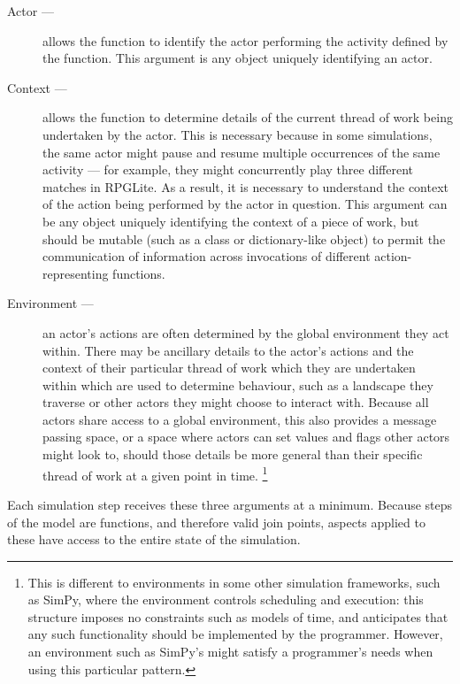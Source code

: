 \begin{description}
  \item[Actor ---] allows the function to identify the actor performing the activity
    defined by the function. This argument is any object uniquely identifying an
    actor.
  \item[Context ---] allows the function to determine details of the current
    thread of work being undertaken by the actor. This is necessary because in
    some simulations, the same actor might pause and resume multiple occurrences
    of the same activity --- for example, they might concurrently play three
    different matches in RPGLite. As a result, it is necessary to understand the
    context of the action being performed by the actor in question. This
    argument can be any object uniquely identifying the context of a piece of
    work, but should be mutable (such as a class or dictionary-like object) to
    permit the communication of information across invocations of different
    action-representing functions.
  \item[Environment ---] an actor's actions are often determined by the global
    environment they act within. There may be ancillary details to the
    actor's actions and the context of their particular thread of work which
    they are undertaken within which are used to determine behaviour, such
    as a landscape they traverse or other actors they might choose to
    interact with. Because all actors share access to a global environment,
    this also provides a message passing space, or a space where actors can
    set values and flags other actors might look to, should those details be
    more general than their specific thread of work at a given point in time.
    \footnote{This is different to environments in some other simulation frameworks, such
    as SimPy\cite{simpy_documentation}, where the environment controls scheduling and
    execution: this structure imposes no constraints such as models of time, and
    anticipates that any such functionality should be implemented by the
    programmer. However, an environment such as SimPy's might satisfy a programmer's needs
    when using this particular pattern.}
\end{description}

Each simulation step receives these three arguments at a minimum. Because steps
of the model are functions, and therefore valid join points, aspects applied to
these have access to the entire state of the simulation.

